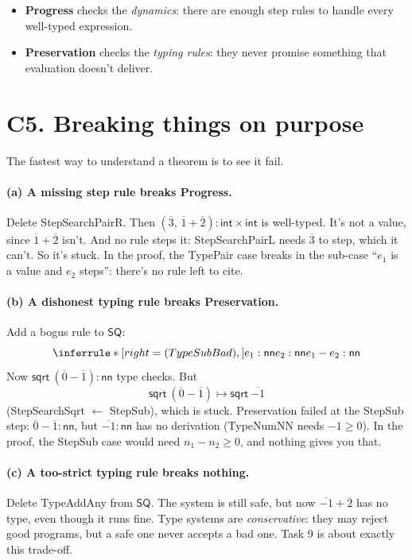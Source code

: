 \documentclass[11pt]{article}
\newcommand{\PAIR}[2]{(#1,\, #2)}
\newcommand{\SQRT}[1]{\mathsf{sqrt}\ #1}
\newcommand{\INT}{\mathsf{int}}
\newcommand{\NN}{\mathsf{nn}}
\newcommand{\num}[1]{\overline{#1}}
\begin{document}
\begin{itemize}
  \item \textbf{Progress} checks the \emph{dynamics}: there are enough step
        rules to handle every well-typed expression.
  \item \textbf{Preservation} checks the \emph{typing rules}: they never
        promise something that evaluation doesn't deliver.
\end{itemize}

\section*{C5. Breaking things on purpose}

The fastest way to understand a theorem is to see it fail.

\paragraph{(a) A missing step rule breaks Progress.} Delete StepSearchPairR.
Then $\PAIR{\num3}{\num1+\num2}:\INT\times\INT$ is well-typed. It's not a
value, since $\num1+\num2$ isn't. And no rule steps it: StepSearchPairL needs
$\num3$ to step, which it can't. So it's stuck. In the proof, the TypePair
case breaks in the sub-case ``$e_1$ is a value and $e_2$ steps'': there's no
rule left to cite.

\paragraph{(b) A dishonest typing rule breaks Preservation.} Add a bogus rule
to $\mathsf{SQ}$:
\[
  \Rule{TypeSubBad}{e_1:\NN \\ e_2:\NN}{e_1-e_2:\NN}
\]
Now $\SQRT{(\num0-\num1)}:\NN$ type checks. But
\[
  \SQRT{(\num0-\num1)} \mapsto \SQRT{\num{-1}}
\]
(StepSearchSqrt $\leftarrow$ StepSub), which is stuck. Preservation failed
at the StepSub step: $\num0-\num1:\NN$, but $\num{-1}:\NN$ has no
derivation (TypeNumNN needs $-1\ge0$). In the proof, the StepSub case would
need $n_1-n_2\ge0$, and nothing gives you that.

\paragraph{(c) A too-strict typing rule breaks nothing.} Delete TypeAddAny
from $\mathsf{SQ}$. The system is still safe, but now $\num{-1}+\num2$ has
no type, even though it runs fine. Type systems are \emph{conservative}:
they may reject good programs, but a safe one never accepts a bad one.
Task 9 is about exactly this trade-off.
\end{document}
